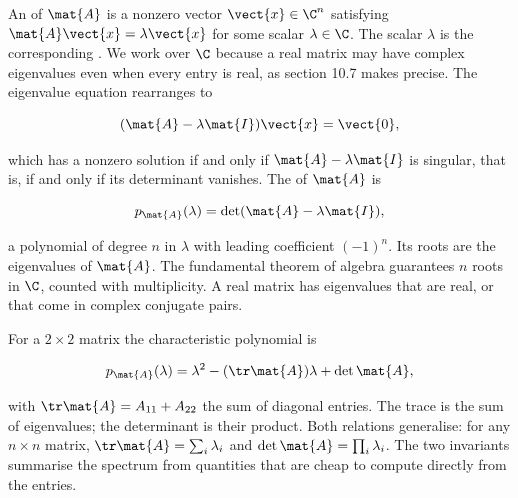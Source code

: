 An  of $\mat{A}$ is a nonzero vector $\vect{x}
\in \C^{n}$ satisfying $\mat{A}\vect{x} = \lambda \vect{x}$ for
some scalar $\lambda \in \C$. The scalar $\lambda$ is the
corresponding . We work over $\C$ because a real
matrix may have complex eigenvalues even when every entry is real,
as section 10.7 makes precise. The eigenvalue equation rearranges to

\[
(\mat{A} - \lambda \mat{I}) \vect{x} = \vect{0},
\]

which has a nonzero solution if and only if $\mat{A} - \lambda
\mat{I}$ is singular, that is, if and only if its determinant
vanishes. The  of $\mat{A}$ is

\[
p_{\mat{A}}(\lambda) = \det(\mat{A} - \lambda \mat{I}),
\]

a polynomial of degree $n$ in $\lambda$ with leading coefficient
$(-1)^{n}$. Its roots are the eigenvalues of $\mat{A}$. The
fundamental theorem of algebra guarantees $n$ roots in $\C$, counted
with multiplicity. A real matrix has eigenvalues that are real, or
that come in complex conjugate pairs.

For a $2 \times 2$ matrix the characteristic polynomial is

\[
p_{\mat{A}}(\lambda) = \lambda^{2} - (\tr \mat{A}) \lambda
+ \det \mat{A},
\]

with $\tr \mat{A} = A_{11} + A_{22}$ the sum of diagonal entries.
The trace is the sum of eigenvalues; the determinant is their
product. Both relations generalise: for any $n \times n$ matrix,
$\tr \mat{A} = \sum_{i} \lambda_{i}$ and $\det \mat{A} = \prod_{i}
\lambda_{i}$. The two invariants summarise the spectrum from
quantities that are cheap to compute directly from the entries.

